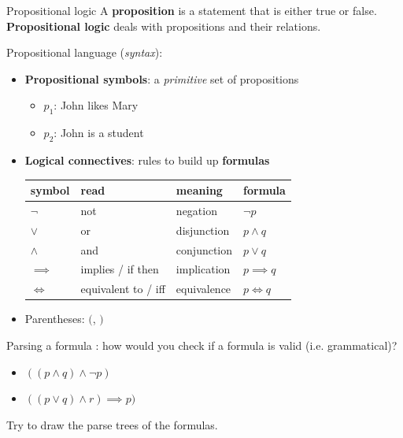 \documentclass[usenames,dvipsnames,notes]{beamer}
\begin{document}
\begin{frame}
    {Propositional logic}
    A \textbf{proposition} is a statement that is either true or false.\\
    \textbf{Propositional logic} deals with propositions and their relations.

    Propositional language (\emph{syntax}):\\
    \begin{itemize}
        \item \textbf{Propositional symbols}: a \textit{primitive} set of propositions
            \begin{itemize}
                \item[] $p_1$: John likes Mary
                \item[] $p_2$: John is a student
            \end{itemize}
        \item \textbf{Logical connectives}: rules to build up \textbf{formulas}
            \begin{table}
                \begin{tabular}{llll}
                    symbol & read & meaning & formula \\
                    \midrule
                    $\neg$ & not & negation & $\neg p$ \\
                    $\lor $ & or & disjunction & $p\wedge q$ \\
                    $\land $ & and & conjunction & $p\vee q$ \\
                    $\implies $ & implies / if then & implication & $p\implies q$\\
                    $\iff$ & equivalent to / iff & equivalence & $p\iff q $ 
                \end{tabular}
            \end{table}
        \item Parentheses: $($, $)$
    \end{itemize}
\end{frame}

\begin{frame}
    {Parsing a formula}
    : how would you check if a formula is valid (i.e. grammatical)?\\
    \begin{itemize}
        \item[] $((p\land q) \land \neg p)$
        \item[] $((p\lor q) \land r) \implies p)$
    \end{itemize}
    Try to draw the parse trees of the formulas.

\end{frame}
\end{document}
